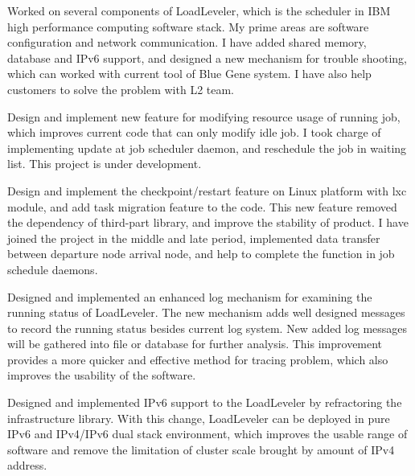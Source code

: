 \documentclass[11pt]{article}
\begin{document}
\setlength{\leftskip}{.155\textwidth}
Worked on several components of LoadLeveler, which is the scheduler in IBM high
performance computing software stack.  My prime areas are software configuration
and network communication. I have added shared memory, database and IPv6 support,
and designed a new mechanism for trouble shooting,
which can worked with current tool of Blue Gene system.
I have also help customers to solve the problem with L2 team.

\begin{description}[leftmargin=\leftskip, labelindent=.12\textwidth]
    \item[{Dynamic Resource Usage Modification \normalfont(Jan, 2012 - current):}] %
        Design and implement new feature for modifying resource usage of running job,
        which improves current code that can only modify idle job.
        I took charge of implementing update at job scheduler daemon,
        and reschedule the job in waiting list. This project is under development.

    \item[{Task Migration \normalfont(Jun, 2011 - Jan, 2012):}] %
        Design and implement the checkpoint/restart feature on Linux platform with lxc module,
        and add task migration feature to the code. This new feature removed the dependency of third-part library,
        and improve the stability of product. I have joined the project in the middle and late period,
        implemented data transfer between departure node arrival node,
        and help to complete the function in job schedule daemons.

    \item[{Log Enhancement \normalfont(Apr, 2010 - Apr, 2011):}] %
        Designed and implemented an enhanced log mechanism for examining the running status of LoadLeveler.
        The new mechanism adds well designed messages to record the running status besides current log system.
        New added log messages will be gathered into file or database for further analysis.
        This improvement provides a more quicker and effective method for tracing problem,
        which also improves the usability of the software.

    \item[{IPv6 Support \normalfont(Oct, 2009 - Mar, 2010):}] %
        Designed and implemented IPv6 support to the LoadLeveler by refractoring the infrastructure library.
        With this change, LoadLeveler can be deployed in pure IPv6 and IPv4/IPv6 dual stack environment,
        which improves the usable range of software and
        remove the limitation of cluster scale brought by amount of IPv4 address.


\end{description}
\end{document}
